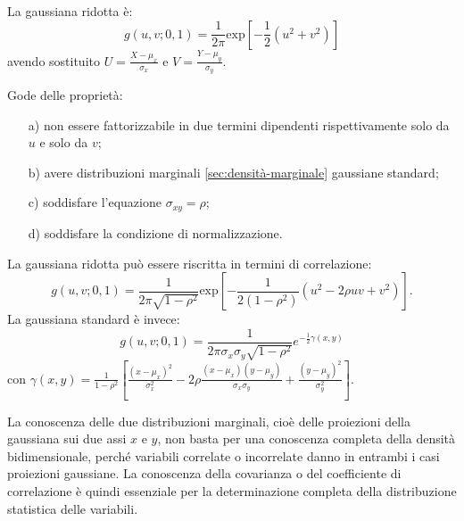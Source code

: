 La gaussiana ridotta è:
\begin{equation}
\label{eq:gauss-ridotta-2D}
g\left( u,v;0,1 \right) =\frac { 1 }{ 2\pi  } { \textrm{exp} }\left[ -\frac { 1 }{ 2 } \left( { u }^{ 2 }+{ v }^{ 2 } \right)  \right]
\end{equation}
avendo sostituito $U=\frac { X-\mu _{ x } }{ \sigma _{ x } } $ e $V=\frac { Y-\mu _{ y } }{ \sigma _{ y } } $.

Gode delle proprietà:
\begin{itemize}
\item[a)] non essere fattorizzabile in due termini dipendenti rispettivamente solo da $u$ e solo da $v$;
\item[b)] avere distribuzioni marginali \ref{sec:densità-marginale} gaussiane standard;
\item[c)] soddisfare l'equazione $\sigma_{xy}=\rho$;
\item[d)] soddisfare la condizione di normalizzazione.
\end{itemize}
La gaussiana ridotta può essere riscritta in termini di correlazione:
\begin{equation}
g\left( u,v;0,1 \right) =\frac { 1 }{ 2\pi \sqrt { 1-\rho ^{ 2 } }  } { \textrm{exp} }\left[ -\frac { 1 }{ 2\left( 1-\rho ^{ 2 } \right)  } \left( { u }^{ 2 }-2\rho uv+{ v }^{ 2 } \right)  \right] .
\end{equation}
La gaussiana standard è invece:
\begin{equation}
\label{eq:gauss-standard-correlazione}
g\left( u,v;0,1 \right) =\frac { 1 }{ 2\pi \sigma _{ x }\sigma _{ y }\sqrt { 1-\rho ^{ 2 } }  } { e }^{ -\frac { 1 }{ 2 } \gamma \left( x,y \right)  }
\end{equation}
con $\gamma \left( x,y \right) =\frac { 1 }{ 1-\rho ^{ 2 } } \left[ \frac { { \left( x-{ \mu  }_{ x } \right)  }^{ 2 } }{ { \sigma  }_{ x }^{ 2 } } -2\rho \frac { \left( x-{ \mu  }_{ x } \right) \left( y-{ \mu  }_{ y } \right)  }{ { \sigma  }_{ x }{ \sigma  }_{ y } } +\frac { { \left( y-{ \mu  }_{ y } \right)  }^{ 2 } }{ { \sigma  }_{ y }^{ 2 } }  \right] $.

La conoscenza delle due distribuzioni marginali, cioè delle proiezioni della gaussiana sui due assi $x$ e $y$, non basta per una conoscenza completa della densità bidimensionale, perché variabili correlate o incorrelate danno in entrambi i casi proiezioni gaussiane. La conoscenza della covarianza o del coefficiente di correlazione è quindi essenziale per la determinazione completa della distribuzione statistica delle variabili.

